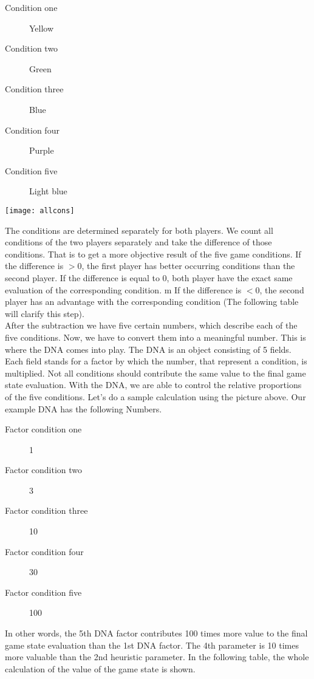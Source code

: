 \begin{description}
\item[Condition one] Yellow
\item[Condition two] Green
\item[Condition three] Blue
\item[Condition four] Purple
\item[Condition five] Light blue
\end{description}
\begin{fixedpic}
	\centering
	\texttt{[image: allcons]}
\end{fixedpic}
The conditions are determined separately for both players. We count all conditions of the two players separately and take the difference of those conditions. That is to get a more objective result of the five game conditions. If the difference is $>0$, the first player has better occurring conditions than the second player. If the difference is equal to $0$, both player have the exact same evaluation of the corresponding condition. m 
If the difference is $<0$, the second player has an advantage with the corresponding condition
(The following table will clarify this step).\\

After the subtraction we have five certain numbers, which describe each of the five conditions.  Now, we have to convert them into a meaningful number. This is where the DNA comes into play. The DNA is an object consisting of 5 fields. Each field stands for a factor by which the number, that represent a  condition, is multiplied. Not all conditions should contribute the same value to the final game state evaluation. With the DNA, we are able to control the relative proportions of the five conditions. Let's do a sample calculation using the picture above. Our example DNA has the following Numbers. 
\begin{center}
\begin{description}
\item[Factor condition one] 1
\item[Factor condition two] 3
\item[Factor condition three] 10
\item[Factor condition four] 30
\item[Factor condition five] 100
\end{description}
\end{center}

In other words, the 5th DNA factor contributes 100 times more value to the final game state evaluation than the 1st DNA factor. The 4th parameter is 10 times more valuable than the 2nd heuristic parameter. In the following table, the whole calculation of the value of the game state is shown.

